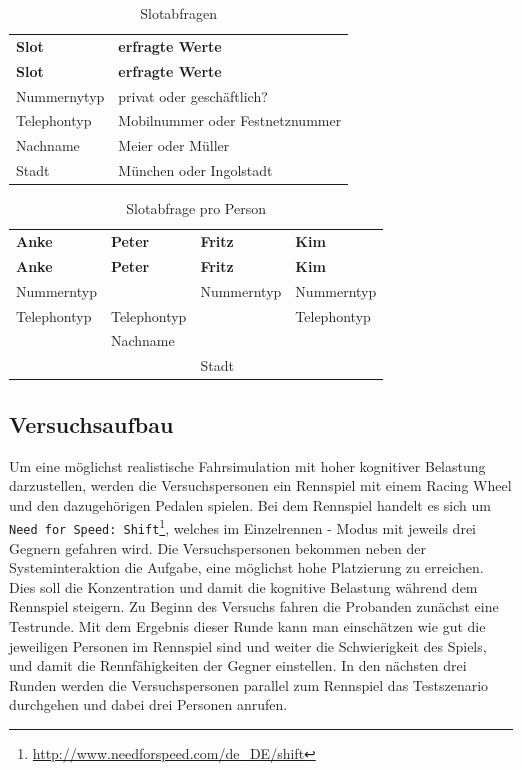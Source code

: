 \documentclass[12pt,a4paper]{scrartcl}
\begin{document}
\begin{longtable}{p{6cm}p{8cm}}
	\label{slots}\\
	\caption[Slotabfragen]{Slotabfragen}\\
	\hline
	\textbf{Slot} &	\textbf{erfragte Werte}\\
	\hline
	\endfirsthead
	\hline
	\textbf{Slot} &	\textbf{erfragte Werte}\\
	\hline
	\endhead
Nummernytyp & privat oder geschäftlich?\\
Telephontyp & Mobilnummer oder Festnetznummer\\
Nachname & Meier oder Müller\\
Stadt & München oder Ingolstadt\\


\hline
\end{longtable}


\begin{longtable}{p{}p{}p{}p{}}
	\label{slotsPerson}\\
	\caption[Slotabfrage pro Person]{Slotabfrage pro Person}\\
	\hline
	\textbf{Anke}&\textbf{Peter}&\textbf{Fritz} &\textbf{Kim}\\
	\hline
	\endfirsthead
	\hline
	\textbf{Anke}&\textbf{Peter}&\textbf{Fritz} &\textbf{Kim}\\
	\hline
	\endhead
Nummerntyp & & Nummerntyp & Nummerntyp\\
Telephontyp & Telephontyp & & Telephontyp \\
& Nachname & & \\
& & Stadt & \\

\hline
\end{longtable}


\subsection{Versuchsaufbau}
Um eine möglichst realistische Fahrsimulation mit hoher kognitiver Belastung darzustellen, werden die Versuchspersonen ein Rennspiel mit einem Racing Wheel und den dazugehörigen Pedalen spielen. Bei dem Rennspiel handelt es sich um \texttt{Need for Speed: Shift}\footnote{\label{foot:nfs}\url{http://www.needforspeed.com/de_DE/shift}}, welches im Einzelrennen - Modus mit jeweils drei Gegnern gefahren wird. Die Versuchspersonen bekommen neben der Systeminteraktion die Aufgabe, eine möglichst hohe Platzierung zu erreichen. Dies soll die Konzentration und damit die kognitive Belastung während dem Rennspiel steigern. Zu Beginn des Versuchs fahren die Probanden zunächst eine Testrunde. Mit dem Ergebnis dieser Runde kann man einschätzen wie gut die jeweiligen Personen im Rennspiel sind und weiter die Schwierigkeit des Spiels, und damit die Rennfähigkeiten der Gegner einstellen. In den nächsten drei Runden werden die Versuchspersonen parallel zum Rennspiel das Testszenario durchgehen und dabei drei Personen anrufen. 
\end{document}
